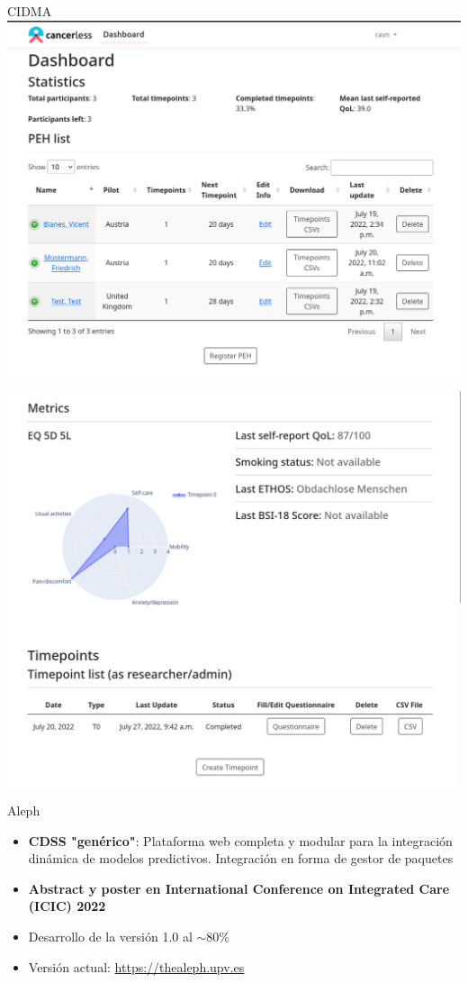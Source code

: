 \documentclass[bigger]{beamer}
\begin{document}
	\begin{frame}{CIDMA}
		\centering
		\includegraphics[scale=0.27]{img/main_shaboard.png}
	\end{frame}

	\begin{frame}
		\centering
		\includegraphics[scale=0.27]{img/peh_dashboard.png}
	\end{frame}

	\begin{frame}{Aleph}
		\begin{itemize}
			\item \textbf{CDSS "genérico"}: Plataforma web completa y modular para la integración dinámica de modelos predictivos. Integración en forma de gestor de paquetes
			\item \textbf{Abstract y poster en International Conference on Integrated Care (ICIC) 2022}
			\item Desarrollo de la versión 1.0 al $\sim$80\%
			\item Versión actual: \url{https://thealeph.upv.es}
 		\end{itemize}
	\end{frame}
\end{document}
